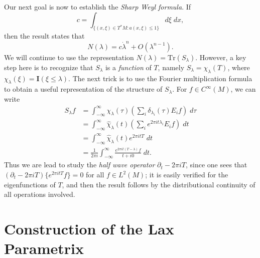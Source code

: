 Our next goal is now to establish the \emph{Sharp Weyl formula}. If
%
\[ c = \int_{\{ (x,\xi) \in T^*M : a(x,\xi) \leq 1 \}} d\xi\; dx, \]
%
then the result states that
%
\[ N(\lambda) = c \dot \lambda^n + O(\lambda^{n-1}). \]
%
We will continue to use the representation $N(\lambda) = \text{Tr}(S_\lambda)$. However, a key step here is to recognize that $S_\lambda$ is a \emph{function} of $T$, namely $S_\lambda = \chi_\lambda(T)$, where $\chi_\lambda(\xi) = \mathbf{I}(\xi \leq \lambda)$. The next trick is to use the Fourier multiplication formula to obtain a useful representation of the structure of $S_\lambda$. For $f \in C^\infty(M)$, we can write
%
\begin{align*}
    S_\lambda f &= \int_{-\infty}^\infty \chi_\lambda(\tau) \left( \sum_i \delta_{\lambda_i}(\tau) E_i f \right)\; d\tau\\
    &= \int_{-\infty}^\infty \widehat{\chi}_\lambda(t) \left( \sum_i e^{2 \pi i t \lambda_i} E_i f \right)\; dt\\
    &= \int_{-\infty}^\infty \widehat{\chi}_\lambda(t) e^{2 \pi i t T}\; dt\\
    &= \frac{1}{2 \pi i} \int_{-\infty}^\infty \frac{e^{2 \pi i t (T - \lambda)} f}{t + i0}\; dt.
\end{align*}
%
Thus we are lead to study the \emph{half wave operator} $\partial_t - 2 \pi i T$, since one sees that $(\partial_t - 2 \pi i T) \{ e^{2 \pi i t T} f \} = 0$ for all $f \in L^2(M)$; it is easily verified for the eigenfunctions of $T$, and then the result follows by the distributional continuity of all operations involved.





\section{Construction of the Lax Parametrix}



